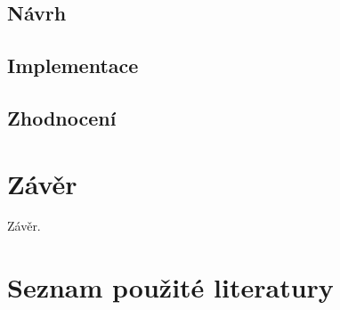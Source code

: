 \documentclass[FM]{tulthesis}
\begin{document}
	\section{Návrh}
	
	\section{Implementace}
	
	\section{Zhodnocení}
	
	\chapter{Závěr}
	
	Závěr.
	
	\chapter*{Seznam použité literatury}
	\printbibliography[heading=none]
	
\end{document}
